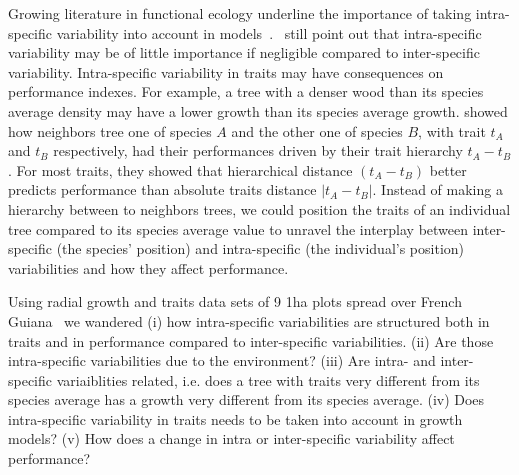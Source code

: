 Growing literature in functional ecology underline the importance of taking intra-specific variability into account in models~\citep{violle_towards_2009, albert_when_2011, violle_return_2012}.~\citet{albert_when_2011} still point out that intra-specific variability may be of little importance if negligible compared to inter-specific variability. Intra-specific variability in traits may have consequences on performance indexes. For example, a tree with a denser wood than its species average density may have a lower growth than its species average growth. \citet{kunstler_competitive_2012} showed how neighbors tree one of species $A$ and the other one of species $B$, with trait $t_A$ and $t_B$ respectively, had their performances driven by their trait hierarchy $t_A - t_B$. For most traits, they showed that hierarchical distance $(t_A - t_B)$ better predicts performance than absolute traits distance $\vert t_A - t_B \vert$. Instead of making a hierarchy between to neighbors trees, we could position the traits of an individual tree compared to its species average value to unravel the interplay between inter-specific (the species' position) and intra-specific (the individual's position) variabilities and how they affect performance.

Using radial growth and traits data sets of 9 1ha plots spread over French Guiana~\citep{baraloto_decoupled_2010} we wandered (i) how intra-specific variabilities are structured both in traits and in performance compared to inter-specific variabilities. (ii) Are those intra-specific variabilities due to the environment? (iii) Are intra- and inter- specific variaiblities related, i.e. does a tree with traits very different from its species average has a growth very different from its species average. (iv) Does intra-specific variability in traits needs to be taken into account in growth models? (v) How does a change in intra or inter-specific variability affect performance?